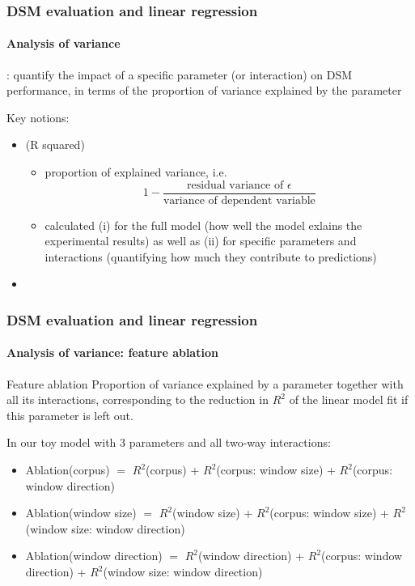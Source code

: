 \documentclass[t]{beamer} %
\begin{document}
\begin{frame}
  \frametitle{DSM evaluation and linear regression}
  \framesubtitle{Analysis of variance}

  \begin{block}{}\footnotesize
    : quantify the impact of a specific parameter (or interaction) on DSM performance, in terms of the proportion of variance explained by the parameter
  \end{block}

  \footnotesize
  Key notions:
  \begin{itemize}
  \item {} (R squared)
    \begin{itemize}\footnotesize
    \item proportion of explained variance, i.e.\
      \[
      1 - \frac{\text{residual variance of $\epsilon$}}{\text{variance of dependent variable}}
      \]
    \item calculated (i) for the full model (\so how well the model exlains the experimental results) as well as (ii) for specific parameters and interactions (quantifying how much they contribute to predictions)
    \end{itemize}
  \item  {}

  \end{itemize}
\end{frame}

\begin{frame}
  \frametitle{DSM evaluation and linear regression}
  \framesubtitle{Analysis of variance: feature ablation}

  \begin{block}{Feature ablation}
    Proportion of variance explained by a parameter together with all its interactions, corresponding to the reduction in  $R^2$ of the linear model fit if this parameter is left out. 
  \end{block}

  In our toy model with 3 parameters and all two-way interactions: 

  \begin{itemize}\footnotesize
  \item Ablation(corpus) $=$  $R^2$(corpus) +  $R^2$(corpus: window size) +  $R^2$(corpus: window direction)  
  \item Ablation(window size) $=$  $R^2$(window size) +  $R^2$(corpus: window size) +  $R^2$(window size: window direction)
  \item Ablation(window direction) $=$  $R^2$(window direction) +  $R^2$(corpus: window direction) +  $R^2$(window size: window direction) 
  \end{itemize}

\end{frame}
\end{document}
